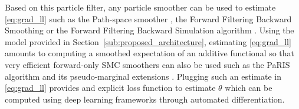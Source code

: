 \documentclass[journal]{IEEEtran}
\begin{document}
Based on this particle filter, any particle smoother can be used to estimate \eqref{eq:grad_ll} such as the Path-space smoother \cite{Kitagawa1996}, the Forward Filtering Backward Smoothing \cite{Doucet2000OnSM} or the Forward Filtering Backward Simulation algorithm \cite{Godsill2004MonteCS}.
Using the model provided in Section~\ref{sub:proposed_architecture}, estimating \eqref{eq:grad_ll} amounts to computing a smoothed expectation of an additive functional so that very efficient forward-only SMC smoothers can also be used such as the PaRIS algorithm and its pseudo-marginal extensions \cite{Olsson2014EfficientPO,gloaguen2022pseudo}.
Plugging such an estimate in \ref{eq:grad_ll} provides and explicit loss function to estimate $\theta$ which can be computed using deep learning frameworks through automated differentiation. %

\end{document}
